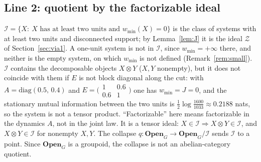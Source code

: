 \subsection{Line 2: quotient by the factorizable ideal}\label{sec:l2}
$\mathcal I=\{X:\ X\text{ has at least two units and }w_{\min}(X)=0\}$ is the class of systems with at least two units and disconnected support; by Lemma~\ref{lem:J} it is the ideal $\mathcal Z$ of Section~\ref{sec:via1}. A one-unit system is not in $\mathcal I$, since $w_{\min}=+\infty$ there, and neither is the empty system, on which $w_{\min}$ is not defined (Remark~\ref{rem:small}). $\mathcal I$ contains the decomposable objects $X\otimes Y$ ($X,Y$ nonempty), but it does not coincide with them if $E$ is not block diagonal along the cut: with $A=\mathrm{diag}(0.5,\,0.4)$ and $E=\bigl(\begin{smallmatrix}1&0.6\\0.6&1\end{smallmatrix}\bigr)$ one has $w_{\min}=J=0$, and the stationary mutual information between the two units is $\tfrac12\log\tfrac{1600}{1033}\approx0.2188$ nats, so the system is not a tensor product. ``Factorizable'' here means factorizable in the dynamics $A$, not in the joint law. It is a tensor ideal: $X\in\mathcal I\Rightarrow X\otimes Y\in\mathcal I$, and $X\otimes Y\in\mathcal I$ for nonempty $X,Y$. The collapse $q:\mathbf{Open}_G\to\mathbf{Open}_G/\mathcal I$ sends $\mathcal I$ to a point. Since $\mathbf{Open}_G$ is a groupoid, the collapse is not an abelian-category quotient.
